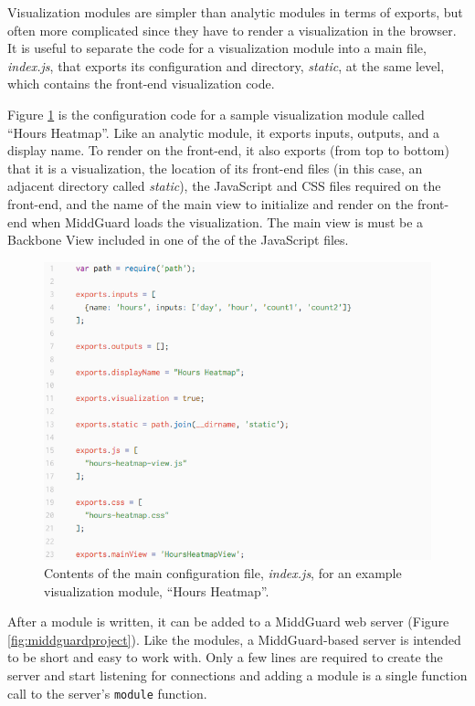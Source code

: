 \documentclass[midd]{thesis}
\begin{document}
Visualization modules are simpler than analytic modules in terms of exports, but
often more complicated since they have to render a visualization in the browser.
It is useful to separate the code for a visualization module into a main file,
\textit{index.js}, that exports its configuration and directory,
\textit{static}, at the same level, which contains the front-end visualization
code.

Figure \ref{fig:visualizationmodule} is the configuration code for a sample
visualization module called ``Hours Heatmap''. Like an analytic module, it
exports inputs, outputs, and a display name. To render on the front-end, it also
exports (from top to bottom) that it is a visualization, the location of its
front-end files (in this case, an adjacent directory called \textit{static}),
the JavaScript and CSS files required on the front-end, and the name of the main
view to initialize and render on the front-end when MiddGuard loads the
visualization. The main view is must be a Backbone View included in one of the
of the JavaScript files.

\begin{figure}[!ht]
  \centering
  \includegraphics[width=.85\textwidth]{visualizationmodule}
  \caption{Contents of the main configuration file, \textit{index.js}, for an
  example visualization module, ``Hours Heatmap''.}
  \label{fig:visualizationmodule}
\end{figure}

After a module is written, it can be added to a MiddGuard web server (Figure
\ref{fig:middguardproject}). Like the modules, a MiddGuard-based server is
intended to be short and easy to work with. Only a few lines are required to
create the server and start listening for connections and adding a module is a
single function call to the server's \texttt{module} function.
\end{document}
